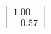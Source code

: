 \documentclass[preview]{standalone}
\begin{document}
\begin{align*}
\begin{bmatrix} 1.00 \\ -0.57 \end{bmatrix}
\end{align*}
\end{document}
